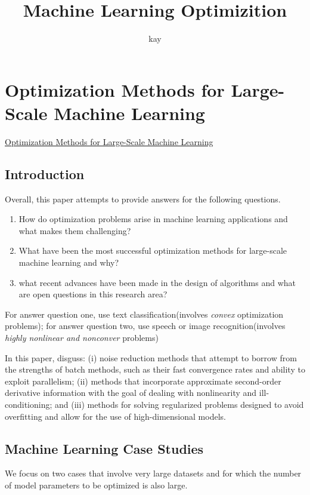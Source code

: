 \documentclass[hyperref, UTF-8]{ctexart}
\author{kay}
\title{Machine Learning Optimizition}
\begin{document}
\maketitle
\tableofcontents
\section{Optimization Methods for Large-Scale Machine Learning}
\href{https://arxiv.org/abs/1606.04838}{Optimization Methods for Large-Scale Machine Learning}
\subsection{Introduction}
Overall, this paper attempts to provide answers for the following questions.
\begin{enumerate}
\item{How do optimization problems arise in machine learning applications and
    what makes them challenging?}
\item{What have been the most successful optimization methods for large-scale
    machine learning and why?}
\item{what recent advances have been made in the design of algorithms and what
    are open questions in this research area?}
\end{enumerate}
For answer question one, use text classification(involves \emph{convex}
optimization problems); for answer question two, use speech or image
recognition(involves \emph{highly nonlinear and nonconver} problems)

In this paper, disguss: (i) noise reduction methods that attempt to borrow from
the strengths of batch methods, such as their fast convergence rates and ability
to exploit parallelism; (ii) methods that incorporate approximate second-order
derivative information with the goal of dealing with nonlinearity and
ill-conditioning; and (iii) methods for solving regularized problems designed to
avoid overfitting and allow for the use of high-dimensional models.
 
\subsection{Machine Learning Case Studies}
We focus on two cases that involve very large datasets and for which the number of model parameters to be optimized is also large. 
\end{document}
